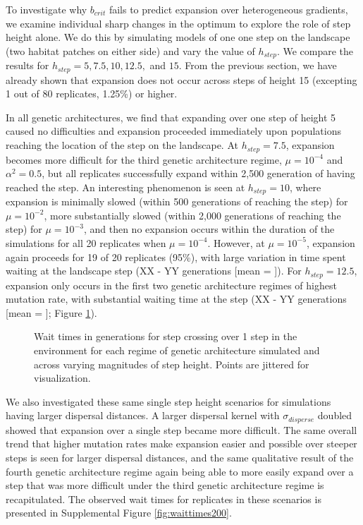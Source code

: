 To investigate why $b_{crit}$ fails to predict expansion over heterogeneous gradients, we examine individual sharp changes in the optimum to explore the role of step height alone. We do this by simulating models of one one step on the landscape (two habitat patches on either side) and vary the value of $h_{step}$. We compare the results for $h_{step} = 5, 7.5, 10, 12.5,$ and $15$. From the previous section, we have already shown that expansion does not occur across steps of height 15 (excepting 1 out of 80 replicates, 1.25\%) or higher.

In all genetic architectures, we find that expanding over one step of height 5 caused no difficulties and expansion proceeded immediately upon populations reaching the location of the step on the landscape. At $h_{step} = 7.5$, expansion becomes more difficult for the third genetic architecture regime, $\mu = 10^{-4}$ and $\alpha^2 = 0.5$, but all replicates successfully expand within 2,500 generation of having reached the step. An interesting phenomenon is seen at $h_{step} = 10$, where expansion is minimally slowed (within 500 generations of reaching the step) for $\mu = 10^{-2}$, more substantially slowed (within 2,000 generations of reaching the step) for $\mu = 10^{-3}$, and then no expansion occurs within the duration of the simulations for all 20 replicates when $\mu = 10^{-4}$. However, at $\mu = 10^{-5}$, expansion again proceeds for 19 of 20 replicates (95\%), with large variation in time spent waiting at the landscape step (\color{red}XX - YY generations [mean = ]\color{black}). For $h_{step} = 12.5$, expansion only occurs in the first two genetic architecture regimes of highest mutation rate, with substantial waiting time at the step (\color{red}XX - YY generations [mean = ]\color{black}; Figure \ref{fig:waittimes}).



\begin{figure}[h]
\centering
{}
\caption[Wait times for step crossing.]{Wait times in generations for step crossing over 1 step in the environment for each regime of genetic architecture simulated and across varying magnitudes of step height. Points are jittered for visualization.}
\label{fig:waittimes}
\end{figure}

We also investigated these same single step height scenarios for simulations having larger dispersal distances. A larger dispersal kernel with $\sigma_{disperse}$ doubled showed that expansion over a single step became more difficult. The same overall trend that higher mutation rates make expansion easier and possible over steeper steps is seen for larger dispersal distances, and the same qualitative result of the fourth genetic architecture regime again being able to more easily expand over a step that was more difficult under the third genetic architecture regime is recapitulated. The observed wait times for replicates in these scenarios is presented in Supplemental Figure \ref{fig:waittimes200}.

